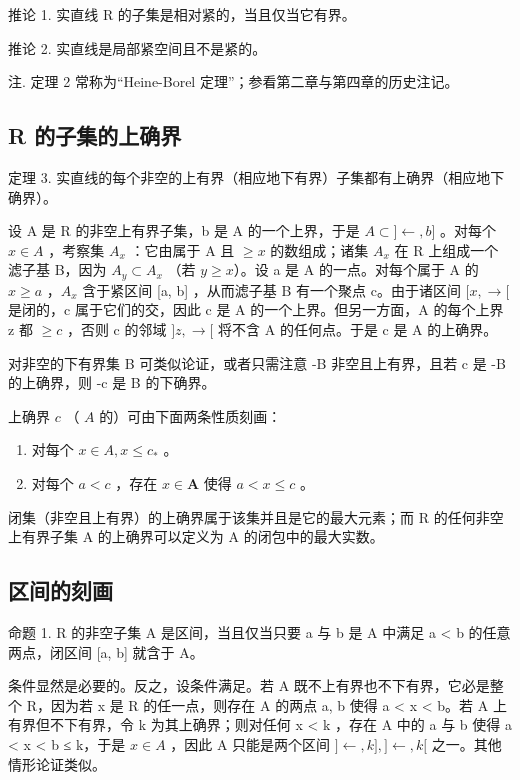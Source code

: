 推论 1. 实直线 R 的子集是相对紧的，当且仅当它有界。

推论 2. 实直线是局部紧空间且不是紧的。

注. 定理 2 常称为“Heine-Borel 定理”；参看第二章与第四章的历史注记。

\subsection{R 的子集的上确界}

定理 3. 实直线的每个非空的上有界（相应地下有界）子集都有上确界（相应地下确界）。

设 A 是 R 的非空上有界子集，b 是 A 的一个上界，于是 \(A \subset ] \leftarrow, b]\) 。对每个 \(x \in A\) ，考察集 \(A_x\) ：它由属于 A 且 \(\geqslant x\) 的数组成；诸集 \(A_x\) 在 R 上组成一个滤子基 B，因为 \(A_y \subset A_x\) （若 \(y \geqslant x\)）。设 a 是 A 的一点。对每个属于 A 的 \(x \geqslant a\) ，\(A_x\) 含于紧区间 {[}a, b{]} ，从而滤子基 B 有一个聚点 c。由于诸区间 \([x, \rightarrow[\) 是闭的，c 属于它们的交，因此 c 是 A 的一个上界。但另一方面，A 的每个上界 z 都 \(\geqslant c\) ，否则 c 的邻域 \(]z, \rightarrow[\) 将不含 A 的任何点。于是 c 是 A 的上确界。

对非空的下有界集 B 可类似论证，或者只需注意 -B 非空且上有界，且若 c 是 -B 的上确界，则 -c 是 B 的下确界。

上确界 \(c\) （ \(A\) 的）可由下面两条性质刻画：

\begin{enumerate}
\def\labelenumi{(\roman{enumi})}
\item
  对每个 \(x \in A, x \leqslant c_*\) 。
\item
  对每个 \(a < c\) ，存在 \(x \in \mathbf{A}\) 使得 \(a < x \leqslant c\) 。
\end{enumerate}

闭集（非空且上有界）的上确界属于该集并且是它的最大元素；而 R 的任何非空上有界子集 A 的上确界可以定义为 A 的闭包中的最大实数。

\subsection{区间的刻画}

命题 1. R 的非空子集 A 是区间，当且仅当只要 a 与 b 是 A 中满足 a \textless{} b 的任意两点，闭区间 {[}a, b{]} 就含于 A。

条件显然是必要的。反之，设条件满足。若 A 既不上有界也不下有界，它必是整个 R，因为若 x 是 R 的任一点，则存在 A 的两点 a, b 使得 a \textless{} x \textless{} b。若 A 上有界但不下有界，令 k 为其上确界；则对任何 x \textless{} k ，存在 A 中的 a 与 b 使得 a \textless{} x \textless{} b ≤ k，于是 \(x \in A\) ，因此 A 只能是两个区间 \(] \leftarrow, k],] \leftarrow, k[\) 之一。其他情形论证类似。

